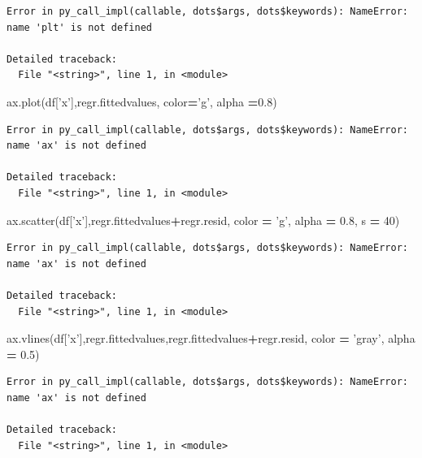 \documentclass[]{book}
\newenvironment{Shaded}{\begin{snugshade}}{\end{snugshade}}
\newcommand{\DecValTok}[1]{\textcolor[rgb]{0.00,0.00,0.81}{#1}}
\newcommand{\FloatTok}[1]{\textcolor[rgb]{0.00,0.00,0.81}{#1}}
\newcommand{\NormalTok}[1]{#1}
\newcommand{\OperatorTok}[1]{\textcolor[rgb]{0.81,0.36,0.00}{\textbf{#1}}}
\newcommand{\StringTok}[1]{\textcolor[rgb]{0.31,0.60,0.02}{#1}}
\begin{document}
\begin{verbatim}
Error in py_call_impl(callable, dots$args, dots$keywords): NameError: name 'plt' is not defined

Detailed traceback: 
  File "<string>", line 1, in <module>
\end{verbatim}

\begin{Shaded}
\begin{Highlighting}[]
\NormalTok{ax.plot(df[}\StringTok{'x'}\NormalTok{],regr.fittedvalues, color}\OperatorTok{=}\StringTok{'g'}\NormalTok{, alpha }\OperatorTok{=}\FloatTok{0.8}\NormalTok{)}
\end{Highlighting}
\end{Shaded}

\begin{verbatim}
Error in py_call_impl(callable, dots$args, dots$keywords): NameError: name 'ax' is not defined

Detailed traceback: 
  File "<string>", line 1, in <module>
\end{verbatim}

\begin{Shaded}
\begin{Highlighting}[]
\NormalTok{ax.scatter(df[}\StringTok{'x'}\NormalTok{],regr.fittedvalues}\OperatorTok{+}\NormalTok{regr.resid, color }\OperatorTok{=} \StringTok{'g'}\NormalTok{, alpha }\OperatorTok{=} \FloatTok{0.8}\NormalTok{, s }\OperatorTok{=} \DecValTok{40}\NormalTok{)}
\end{Highlighting}
\end{Shaded}

\begin{verbatim}
Error in py_call_impl(callable, dots$args, dots$keywords): NameError: name 'ax' is not defined

Detailed traceback: 
  File "<string>", line 1, in <module>
\end{verbatim}

\begin{Shaded}
\begin{Highlighting}[]
\NormalTok{ax.vlines(df[}\StringTok{'x'}\NormalTok{],regr.fittedvalues,regr.fittedvalues}\OperatorTok{+}\NormalTok{regr.resid, color }\OperatorTok{=} \StringTok{'gray'}\NormalTok{, alpha }\OperatorTok{=} \FloatTok{0.5}\NormalTok{)}
\end{Highlighting}
\end{Shaded}

\begin{verbatim}
Error in py_call_impl(callable, dots$args, dots$keywords): NameError: name 'ax' is not defined

Detailed traceback: 
  File "<string>", line 1, in <module>
\end{verbatim}
\end{document}
